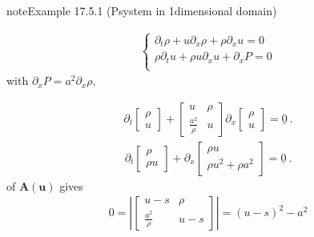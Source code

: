 \documentclass[letterpaper,10pt,english]{jupyterBook}
\begin{document}
\begin{sphinxadmonition}{note}{Example 17.5.1 (P\sphinxhyphen{}system in 1\sphinxhyphen{}dimensional domain)}


\begin{equation*}
\begin{split}\begin{cases}
 \partial_t \rho + u \partial_x \rho + \rho \partial_x u = 0 \\
 \rho \partial_t u + \rho u \partial_x u + \partial_x P = 0 \\
\end{cases}\end{split}
\end{equation*}
\sphinxAtStartPar
with \(\partial_x P = a^2 \partial_x \rho\),

\sphinxAtStartPar
{}
\begin{equation*}
\begin{split}\partial_t \begin{bmatrix} \rho \\ u \end{bmatrix} + \begin{bmatrix} u & \rho \\ \frac{a^2}{\rho} & u \end{bmatrix} \partial_x \begin{bmatrix} \rho \\ u \end{bmatrix} = \underline{0} \ .\end{split}
\end{equation*}
\sphinxAtStartPar
{}
\begin{equation*}
\begin{split}\partial_t \begin{bmatrix} \rho \\ \rho u \end{bmatrix} + \partial_x \begin{bmatrix} \rho u \\ \rho u^2 + \rho a^2 \end{bmatrix} = \underline{0} \ .\end{split}
\end{equation*}
\sphinxAtStartPar
{} of \(\mathbf{A}(\mathbf{u})\) gives
\begin{equation*}
\begin{split}0 = \left| \begin{bmatrix} u - s & \rho \\ \frac{a^2}{\rho} & u - s \end{bmatrix} \right| = (u - s)^2  - a^2\end{split}

\end{equation*}
\end{sphinxadmonition}
\end{document}
